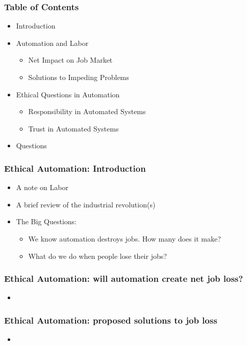\begin{frame}
  \frametitle{ Table of Contents}
  \begin{itemize}
    \item Introduction
    \item Automation and Labor
      \begin{itemize}
        \item Net Impact on Job Market
        \item Solutions to Impeding Problems
      \end{itemize}
    \item Ethical Questions in Automation
      \begin{itemize}
        \item Responsibility in Automated Systems
        \item Trust in Automated Systems
      \end{itemize}
    \item Questions
  \end{itemize}
\end{frame}


\begin{frame}
  \frametitle{ Ethical Automation: Introduction}
  \begin{itemize}
    \item A note on Labor
    \item A brief review of the industrial revolution(s)
    \item The Big Questions:
      \begin{itemize}
        \item We know automation destroys jobs.  How many does it make?
        \item What do we do when people lose their jobs?
      \end{itemize}
  \end{itemize}
\end{frame}


\begin{frame}
  \frametitle{ Ethical Automation: will automation create net job loss?}
  \begin{itemize} 
    \item
  \end{itemize}
\end{frame}


\begin{frame}
  \frametitle{ Ethical Automation: proposed solutions to job loss}
  \begin{itemize}
    \item
  \end{itemize}
\end{frame}

